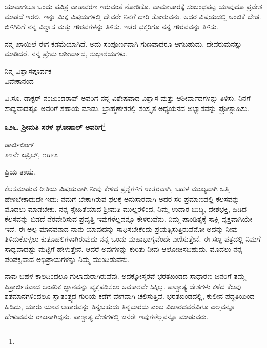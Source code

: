 \vspace{0.1cm}

ಯಾವಾಗಲೂ ಒಂದು ಪವಿತ್ರ ವಾತಾವರಣ ಇರುವಂತೆ ನೋಡಿಕೊ. ವಾಮಾಚಾರಕ್ಕೆ ಸಂಬಂಧಪಟ್ಟ ಯಾವುದೂ ಪ್ರವೇಶ ಮಾಡದೆ ಇರಲಿ. ಇನ್ನು ಮಿಕ್ಕ ವಿಷಯಗಳಲ್ಲಿ ದೇವರೇ ನಿನಗೆ ದಾರಿ ತೋರುವನು. ಅದರ ವಿಷಯದಲ್ಲಿ ಅಂಜಿಕೆ ಬೇಡ. ಬಿಳಿಗಿರಿಗೆ ನನ್ನ ವಿಶ್ವಾಸ ಮತ್ತು ಗೌರವಗಳನ್ನು ತಿಳಿಸು. ಇತರ ಭಕ್ತರಿಗೂ\enginline{-} ನನ್ನ ಗೌರವವನ್ನು ತಿಳಿಸು.

\newpage

ನನ್ನ ಖಾಯಿಲೆ ಈಗ ಕಡಮೆಯಾಗಿದೆ. ಅದು ಸಂಪೂರ್ಣವಾಗಿ ಗುಣವಾದರೂ ಆಗಬಹುದು, ದೇವರುಮನಸ್ಸು ಮಾಡಿದರೆ. ನನ್ನ ಪ್ರೇಮ ಆಶೀರ್ವಾದ, ಶುಭಾಶಯಗಳು.

\begin{flushright}
ನಿನ್ನ ವಿಶ್ವಾಸಪೂರ್ವಕ\\ವಿವೇಕಾನಂದ
\end{flushright}

ವಿ.ಸೂ. ಡಾಕ್ಟರ್ ನಂಜುಂಡರಾವ್ ಅವರಿಗೆ ನನ್ನ ವಿಶೇಷವಾದ ವಿಶ್ವಾಸ ಮತ್ತು ಆಶೀರ್ವಾದಗಳನ್ನು ತಿಳಿಸು. ನಿನಗೆ ಸಾಧ್ಯವಾದಷ್ಟೂ ಅವರಿಗೆ ಸಹಾಯ ಮಾಡು. ಬ್ರಾಹ್ಮಣೇತರಲ್ಲಿ ಸಂಸ್ಕೃತ ಅಧ್ಯಯನದ ಅಭ್ಯಾಸವನ್ನು ಪ್ರೋತ್ಸಾಹಿಸು.

\begin{center}
\textbf{೩೨೬. ಶ‍್ರೀಮತಿ ಸರಳ ಘೋಷಾಲ್ ಅವರಿಗೆ}\footnote{}
\end{center}

\begin{flushright}
ಡಾರ್ಜಿಲಿಂಗ್\\೨೪ನೇ ಏಪ್ರಿಲ್, ೧೮೯೭
\end{flushright}

\noindent
ಪ್ರಿಯ ತಾಯೆ,

ಕೆಲಸಮಾಡುವ ರೀತಿಯ ವಿಷಯವಾಗಿ ನೀವು ಕೇಳಿದ ಪ್ರಶ್ನೆಗಳಿಗೆ ಉತ್ತರವಾಗಿ, ಬಹಳ ಮುಖ್ಯವಾಗಿ ಒತ್ತಿ ಹೇಳಬೇಕಾದುದೇ ಇದು: ನಮಗೆ ಬೇಕಾಗಿರುವ ಫಲಕ್ಕೆ ಅನುಸಾರವಾಗಿ ಅದರ ಸರಿ ಪ್ರಮಾಣದಲ್ಲಿ ಕೆಲಸವನ್ನು ಮೊದಲು ಮಾಡಬೇಕು. ನನ್ನ ಸ್ನೇಹಿತೆಯಾದ ಶ‍್ರೀಮತಿ ಮುಲ್ಲರಳಿಂದ, ನಿಮ್ಮ ಉದಾರ ಬುದ್ಧಿ, ದೇಶಭಕ್ತಿ, ಹಿಡಿದ ಕೆಲಸವನ್ನು ಬಿಡದೆ ನೆರವೇರಿಸುವ ಪ್ರವೃತ್ತಿ ಇವುಗಳೆಲ್ಲವನ್ನೂ ಕೇಳಿರುವೆನು. ನಿಮ್ಮ ಪಾಂಡಿತ್ಯಕ್ಕೆ ಸಾಕ್ಷಿ ವ್ಯಕ್ತವಾಗಿಯೇ ಇದೆ. ಈ ಅಲ್ಪ ಮಾನವನಾದ ನಾನು ಯಾವುದನ್ನು ಸಾಧಿಸಬೇಕೆಂದು ಪ್ರಯತ್ನಿಸುತ್ತಿರುವೆನೋ ಅದನ್ನು ನೀವು ತಿಳಿದುಕೊಳ್ಳಲು ಕುತೂಹಲಿಗಳಾಗಿರುವುದು ನನ್ನ ಒಂದು ಮಹಾಭಾಗ್ಯವೆಂದೇ ಎಣಿಸುತ್ತೇನೆ. ಈ ಸಣ್ಣ ಪತ್ರದಲ್ಲಿ ನಿಮಗೆ ಸಾಧ್ಯವಾದಷ್ಟು ಮಟ್ಟಿಗೆ ಹೇಳುತ್ತೇನೆ. ಆದರೆ ಅವುಗಳನ್ನು ಕುರಿತು ನೀವು ಆಲೋಚಿಸಬಹುದು. ಮೊದಲು ನನ್ನ ಪರಿಪಕ್ವವಾದ ಅಭಿಪ್ರಾಯಗಳನ್ನು ನಿಮ್ಮ ಮುಂದಿಡುವೆನು.

ನಾವು ಬಹಳ ಕಾಲದಿಂದಲೂ ಗುಲಾಮರಾಗಿರುವೆವು. ಅದಕ್ಕೋಸ್ಕರವೆ ಭರತಖಂಡದ ಸಾಧಾರಣ ಜನರಿಗೆ ತಮ್ಮ ಪಿತ್ರಾರ್ಜಿತವಾದ ಆಂತರಿಕ ಜ್ಞಾನವನ್ನು ವ್ಯಕ್ತಪಡಿಸಲು ಅವಕಾಶವೇ ಸಿಕ್ಕಿಲ್ಲ. ಪಾಶ್ಚಾತ್ಯ ದೇಶಗಳು ಕಳೆದ ಕೆಲವು ಶತಮಾನಗಳಿಂದಲೂ ಸ್ವಾತಂತ್ರ್ಯದ ಗುರಿಯ ಕಡೆಗೆ ವೇಗವಾಗಿ ಚಲಿಸುತ್ತಿವೆ. ಭರತಖಂಡದಲ್ಲಿ, ಕುಲೀನ ಪದ್ಧತಿಯಿಂದ ಹಿಡಿದು, ಯಾರು ಯಾವ ಆಹಾರವನ್ನು ತಿನ್ನಬಹುದು ತಿನ್ನಬಾರದು ಎಂಬ ವಿಚಾರದವರೆವಿಗೂ ಎಲ್ಲವನ್ನೂ ಹೇಳುವವನು ರಾಜನಾಗಿದ್ದನು. ಪಾಶ್ಚಾತ್ಯ ದೇಶಗಳಲ್ಲಿ ಜನರೇ ಇವುಗಳೆಲ್ಲವನ್ನೂ ಮಾಡುವರು.

